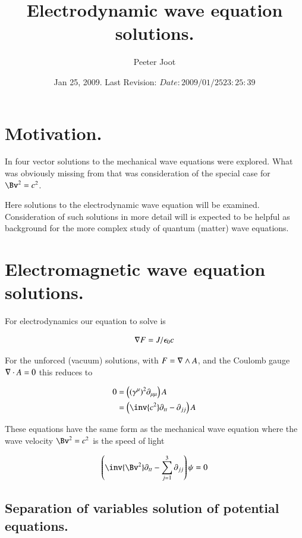 \documentclass{article}
\title{ Electrodynamic wave equation solutions. }
\author{Peeter Joot}
\date{ Jan 25, 2009.  Last Revision: $Date: 2009/01/25 23:25:39 $ }
\begin{document}
\maketitle{}
\tableofcontents

\section{ Motivation. }

In \cite{PJwaveFourVector} four vector solutions to the mechanical wave
equations were explored.  What was obviously missing from that 
was consideration of the special case for $\Bv^2 = c^2$.

Here solutions to the electrodynamic wave equation will be examined.
Consideration of such solutions in more detail will is expected
to be helpful 
as background for the more complex study of quantum (matter) wave equations.

\section{ Electromagnetic wave equation solutions. }

For electrodynamics our equation to solve is

\begin{align}
\nabla F = J/\epsilon_0 c
\end{align}

For the unforced (vacuum) solutions, with 
$F = \nabla \wedge A$, and the Coulomb gauge $\nabla \cdot A = 0$ this 
reduces to

\begin{align*}
0 
&= \left((\gamma^\mu)^2 \partial_{\mu\mu}\right) A  \\
&= \left( \inv{c^2}\partial_{tt} -\partial_{jj} \right) A
\end{align*}

These equations have the same form as the mechanical wave equation
where the wave velocity $\Bv^2 = c^2$ is the speed of light

\begin{align}\label{eqn:waveEquation}
\left( \inv{\Bv^2} \partial_{tt} - \sum_{j=1}^3 \partial_{jj}\right) \psi = 0
\end{align}

\subsection{ Separation of variables solution of potential equations. }
\end{document}
